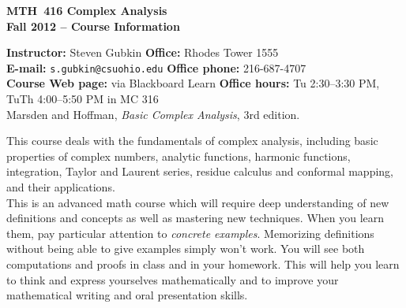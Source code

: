\documentclass[11pt]{article}
\begin{document}
	\begin{center}
		{\noindent \bf \large MTH~416 Complex Analysis\\
			Fall 2012 -- Course Information\\
		}
	\end{center}
	
	\medskip
	
	\begin{tabbing}
		{\bf Instructor:} Steven Gubkin \hspace{1.5in} \=
		{\bf Office:} Rhodes Tower 1555\\ 
		{\bf E-mail:} {\tt s.gubkin@csuohio.edu} \>
		{\bf Office phone:} 216-687-4707\\ 
		{\bf Course Web page:}  via Blackboard Learn  \> 
		{\bf Office hours:} Tu 2:30--3:30 PM,\\ 
		
		 TuTh 4:00--5:50 PM in MC 316\\
		
		 Marsden and Hoffman, {\it
			Basic Complex Analysis}, 3rd edition. \\  
	\end{tabbing}



 
  This course deals with the fundamentals of complex analysis, including basic properties of complex numbers, analytic functions, harmonic functions, integration, Taylor and Laurent series, residue calculus and conformal mapping, and their applications.\\
 
 This is an advanced math course which will require
deep understanding of new definitions and concepts as well as mastering new techniques. 
When you learn them, pay particular attention to {\it concrete examples}.
Memorizing definitions without being able to give examples simply won't work.
You will see both computations and proofs in class and in your homework.
This will help you learn to think and express yourselves mathematically and 
to improve your mathematical writing and oral presentation skills.\\
\end{document}
